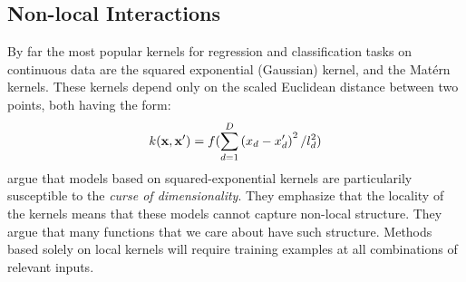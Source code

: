 \subsection{Non-local Interactions}
%
By far the most popular kernels for regression and classification tasks on continuous data are the squared exponential (Gaussian) kernel, and the Mat\'{e}rn kernels.
These kernels depend only on the scaled Euclidean distance between two points, both having the form:
\begin{align}
k({\bf x, x'}) = f(\sum_{d=1}^D \left( x_{d} - x_{d}' \right)^2 / l_d^2)
\end{align}
\citet{bengio2006curse} argue that models based on squared-exponential kernels are particularily susceptible to the \textit{curse of dimensionality}.
They emphasize that the locality of the kernels means that these models cannot capture non-local structure. 
They argue that many functions that we care about have such structure.
Methods based solely on local kernels will require training examples at all combinations of relevant inputs.

